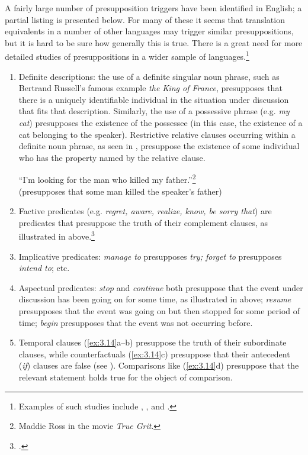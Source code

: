 A fairly large number of presupposition triggers have been identified in English; a partial listing is presented below. For many of these it seems that translation equivalents in a number of other languages may trigger similar presuppositions, but it is hard to be sure how generally this is true. There is a great need for more detailed studies of presuppositions in a wider sample of languages.\footnote{Examples of such studies include \citet{LevinsonAnnamalai1992}, \citet{Matthewson2006}, and \citet{TonhauserEtAl2013}.}


\begin{enumerate}[label=\alph*.]
\item Definite descriptions: the use of a definite singular noun phrase, such as Bertrand Russell’s famous example \textit{the King of France}, presupposes that there is a uniquely identifiable individual in the situation under discussion that fits that description. Similarly, the use of a possessive phrase (e.g. \textit{my cat}) presupposes the existence of the possessee (in this case, the existence of a cat belonging to the speaker). Restrictive relative clauses occurring within a definite noun phrase, as seen in , presuppose the existence of some individual who has the property named by the relative clause.

\ea \label{ex:3.20}
“I’m looking for the man who killed my father.”\footnote{Maddie Ross in the movie \textit{True Grit}.} \\
  (presupposes that some man killed the speaker’s father)
\z

\item Factive predicates (e.g. \textit{regret, aware, realize, know, be sorry that}) are predicates that presuppose the truth of their complement clauses, as illustrated in  above.\footnote{\citet{KiparskyKiparsky1970}.}
\item Implicative predicates: \textit{manage to} presupposes \textit{try; forget to} presupposes \textit{intend to}; etc.
\item Aspectual predicates: \textit{stop} and \textit{continue} both presuppose that the event under discussion has been going on for some time, as illustrated in  above; \textit{resume} presupposes that the event was going on but then stopped for some period of time; \textit{begin} presupposes that the event was not occurring before.
\item Temporal clauses (\ref{ex:3.14}a--b) presuppose the truth of their subordinate clauses, while counterfactuals (\ref{ex:3.14}c) presuppose that their antecedent (\textit{if}) clauses are false (see ). Comparisons like (\ref{ex:3.14}d) presuppose that the relevant statement holds true for the object of comparison.
\end{enumerate}

